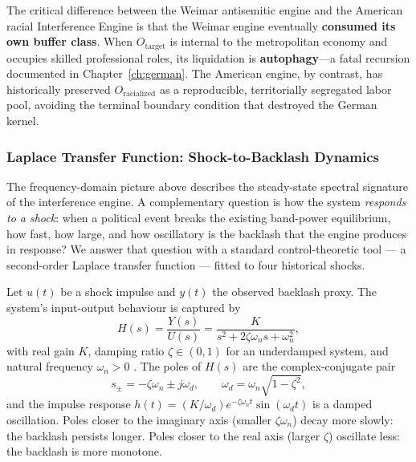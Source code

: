 The critical difference between the Weimar antisemitic engine and the American racial Interference Engine is that the Weimar engine eventually \textbf{consumed its own buffer class}. When $O_{\text{target}}$ is internal to the metropolitan economy and occupies skilled professional roles, its liquidation is \textbf{autophagy}---a fatal recursion documented in Chapter~\ref{ch:german}. The American engine, by contrast, has historically preserved $O_{\text{racialized}}$ as a reproducible, territorially segregated labor pool, avoiding the terminal boundary condition that destroyed the German kernel.

\subsubsection{Laplace Transfer Function: Shock-to-Backlash Dynamics}
\label{sec:laplace_transfer_function}

The frequency-domain picture above describes the steady-state spectral signature of the interference engine. A complementary question is how the system \emph{responds to a shock}: when a political event breaks the existing band-power equilibrium, how fast, how large, and how oscillatory is the backlash that the engine produces in response? We answer that question with a standard control-theoretic tool --- a second-order Laplace transfer function --- fitted to four historical shocks.

Let $u(t)$ be a shock impulse and $y(t)$ the observed backlash proxy. The system's input-output behaviour is captured by
\begin{equation}\label{eq:8.19-laplace-transfer}
H(s) = \frac{Y(s)}{U(s)} = \frac{K}{s^{2} + 2\zeta\omega_n s + \omega_n^{2}},
\end{equation}
with real gain $K$, damping ratio $\zeta \in (0,1)$ for an underdamped system, and natural frequency $\omega_n > 0$ \cite{ogata_modern_control_2010}. The poles of $H(s)$ are the complex-conjugate pair
\begin{equation}\label{eq:8.20-laplace-poles}
s_\pm = -\zeta\omega_n \pm j\omega_d, \qquad \omega_d = \omega_n\sqrt{1-\zeta^{2}},
\end{equation}
and the impulse response $h(t) = (K/\omega_d) e^{-\zeta\omega_n t}\sin(\omega_d t)$ is a damped oscillation. Poles closer to the imaginary axis (smaller $\zeta\omega_n$) decay more slowly: the backlash persists longer. Poles closer to the real axis (larger $\zeta$) oscillate less: the backlash is more monotone.

